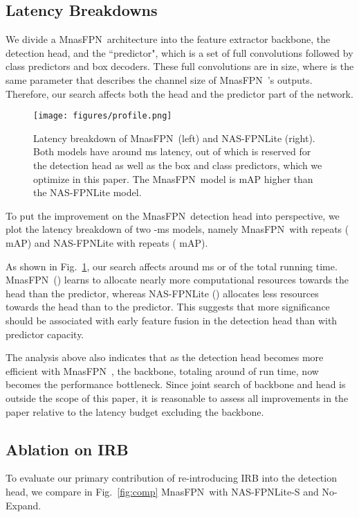\documentclass[10pt,twocolumn,letterpaper]{article}
\def\Mnasfpn{MnasFPN~}
\begin{document}
\subsection{Latency Breakdowns}
We divide a \Mnasfpn architecture into the feature extractor backbone, the detection head, and the ``predictor", which is a set of full convolutions followed by class predictors and box decoders. These full convolutions are  in size, where  is the same parameter that describes the channel size of \Mnasfpn's outputs. Therefore, our search affects both the head and the predictor part of the network.

\begin{figure}[!t]
    \centering
    \texttt{[image: figures/profile.png]}
    \caption{Latency breakdown of \Mnasfpn (left) and NAS-FPNLite (right). Both models have around ms latency, out of which  is reserved for the detection head as well as the box and class predictors, which we optimize in this paper. The \Mnasfpn model is  mAP higher than the NAS-FPNLite model.}
    \label{fig:profile}
\end{figure}

To put the improvement on the \Mnasfpn detection head into perspective, we plot the latency breakdown of two -ms models, namely \Mnasfpn with  repeats ( mAP) and NAS-FPNLite with  repeats ( mAP). 

As shown in Fig.~\ref{fig:profile}, our search affects around  ms or  of the total running time. 
\Mnasfpn () learns to allocate nearly  more computational resources towards the head than the predictor, whereas NAS-FPNLite () allocates less resources towards the head than to the predictor. This suggests that more significance should be associated with early feature fusion in the detection head than with predictor capacity. 

The analysis above also indicates that as the detection head becomes more efficient with \Mnasfpn, the backbone, totaling around  of run time, now becomes the performance bottleneck. Since joint search of backbone and head is outside the scope of this paper, it is reasonable to assess all improvements in the paper relative to the latency budget excluding the backbone. 

\subsection{Ablation on IRB}
\label{sec:ablation-irb}
To evaluate our primary contribution of re-introducing IRB into the detection head, we compare in Fig.~\ref{fig:comp} \Mnasfpn with NAS-FPNLite-S and No-Expand. 
\end{document}

